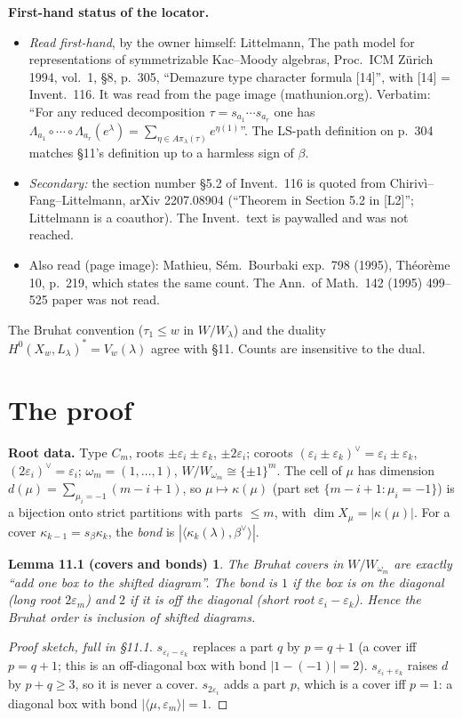 \documentclass[10pt]{amsart}
\newtheorem*{lemA}{Lemma 11.1 (covers and bonds)}
\theoremstyle{remark}
\begin{document}
\textbf{First-hand status of the locator.}
\begin{itemize}
\item \emph{Read first-hand}, by the owner himself: Littelmann, The path model for representations of symmetrizable
Kac--Moody algebras, Proc.\ ICM Z\"urich 1994, vol.~1, \S8, p.~305, ``Demazure type character formula [14]'', with
[14] = Invent.\ 116. It was read from the page image (mathunion.org). Verbatim: ``For any reduced decomposition
$\tau=s_{a_1}\cdots s_{a_r}$ one has $\Lambda_{a_1}\circ\cdots\circ\Lambda_{a_r}(e^\lambda)=\sum_{\eta\in A\pi_\lambda(\tau)}e^{\eta(1)}$''.
The LS-path definition on p.~304 matches \S11's definition up to a harmless sign of $\beta$.
\item \emph{Secondary:} the section number \S5.2 of Invent.\ 116 is quoted from Chirivì--Fang--Littelmann, arXiv
2207.08904 (``Theorem in Section 5.2 in [L2]''; Littelmann is a coauthor). The Invent.\ text is paywalled and was not
reached.
\item Also read (page image): Mathieu, S\'em.\ Bourbaki exp.~798 (1995), Th\'eor\`eme 10, p.~219, which states the same count. The
Ann.\ of Math.\ 142 (1995) 499--525 paper was not read.
\end{itemize}
The Bruhat convention ($\tau_1\le w$ in $W/W_\lambda$) and the duality $H^0(X_w,L_\lambda)^*=V_w(\lambda)$ agree with \S11.
Counts are insensitive to the dual.

\section{The proof}
\textbf{Root data.} Type $C_m$, roots $\pm\varepsilon_i\pm\varepsilon_k$, $\pm2\varepsilon_i$; coroots
$(\varepsilon_i\pm\varepsilon_k)^\vee=\varepsilon_i\pm\varepsilon_k$, $(2\varepsilon_i)^\vee=\varepsilon_i$;
$\omega_m=(1,\dots,1)$, $W/W_{\omega_m}\cong\{\pm1\}^m$. The cell of $\mu$ has dimension
$d(\mu)=\sum_{\mu_i=-1}(m-i+1)$, so $\mu\mapsto\kappa(\mu)$ (part set $\{m-i+1:\mu_i=-1\}$) is a bijection onto strict
partitions with parts $\le m$, with $\dim X_\mu=|\kappa(\mu)|$. For a cover $\kappa_{k-1}=s_\beta\kappa_k$, the
\emph{bond} is $|\langle\kappa_k(\lambda),\beta^\vee\rangle|$.

\begin{lemA}
The Bruhat covers in $W/W_{\omega_m}$ are exactly ``add one box to the shifted diagram''. The bond is $1$ if the box is on the
diagonal (long root $2\varepsilon_m$) and $2$ if it is off the diagonal (short root $\varepsilon_i-\varepsilon_k$). Hence the
Bruhat order is inclusion of shifted diagrams.
\end{lemA}
\begin{proof}[Proof sketch, full in \S11.1]
$s_{\varepsilon_i-\varepsilon_k}$ replaces a part $q$ by $p=q+1$ (a cover iff $p=q+1$; this is an off-diagonal box with
bond $|1-(-1)|=2$). $s_{\varepsilon_i+\varepsilon_k}$ raises $d$ by $p+q\ge3$, so it is never a cover. $s_{2\varepsilon_i}$ adds a part $p$, which
is a cover iff $p=1$: a diagonal box with bond $|\langle\mu,\varepsilon_m\rangle|=1$.
\end{proof}
\end{document}
